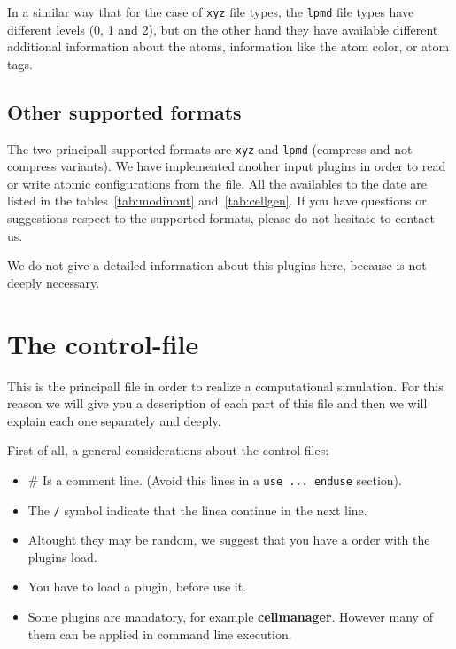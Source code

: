 In a similar way that for the case of \verb|xyz| file types, the \verb|lpmd|
file types have different levels (0, 1 and 2), but on the other hand they have
available different additional information about the atoms, information like
the atom color, or atom tags.

\subsection{Other supported formats}

The two principall supported formats are \verb|xyz| and \verb|lpmd| (compress
and not compress variants). We have implemented another input plugins in order
to read or write atomic configurations from the file. All the availables to the
date are listed in the tables~\ref{tab:modinout} and~\ref{tab:cellgen}. If you
have questions or suggestions respect to the supported formats, please do not
hesitate to contact us.

We do not give a detailed information about this plugins here, because is not
deeply necessary.

\section{The control-file}


This is the principall file in order to realize a computational simulation. For
this reason we will give you a description of each part of this file and then
we will explain each one separately and deeply.

First of all, a general considerations about the control files:

\begin{itemize}
 \item \# Is a comment line. (Avoid this lines in a \texttt{use ... enduse}
section).
 \item The \verb|/| symbol indicate that the linea continue in the next line.
 \item Altought they may be random, we suggest that you have a order with
the plugins load.
 \item You have to load a plugin, before use it.
 \item Some plugins are mandatory, for example \textbf{cellmanager}.
However many of them can be applied in command line execution.
\end{itemize}

